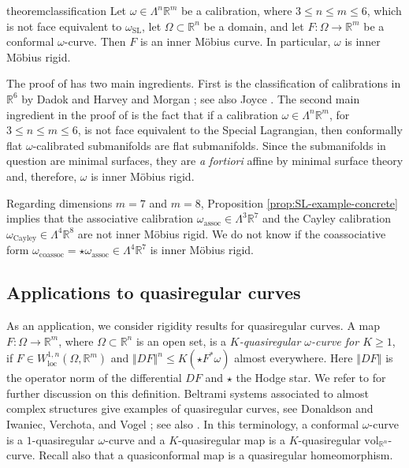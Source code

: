 \documentclass[a4paper,leqno,11pt]{amsart}
\numberwithin{equation}{section}
\theoremstyle{remark}
\theoremstyle{remark}
\newcommand{\R}{\mathbb{R}}
\DeclareMathOperator{\loc}{loc}
\newcommand{\norm}[1]{ \left\Vert #1 \right\Vert }	%
\newcommand{\vol}{\mathrm{vol}}
\newcommand{\SL}{\mathrm{SL}}
\newcommand{\assoc}{\mathrm{assoc}}
\newcommand{\coassoc}{\mathrm{coassoc}}
\newcommand{\Cayley}{\mathrm{Cayley}}
\begin{document}
\begin{restatable}{theorem}{classification}
\label{thm:classification-dim-six}
Let $\omega \in \Lambda^n \R^m$ be a calibration, where $3\le n \le m\le 6$, which is not face equivalent to $\omega_{\SL}$, let $\Omega \subset \R^n$ be a domain, and let $F \colon \Omega \to \R^m$ be a conformal $\omega$-curve. Then $F$ is an inner M\"obius curve. In particular, $\omega$ is inner M\"obius rigid.
\end{restatable}




The proof of  has two main ingredients. First is the classification of calibrations in $\R^6$ by Dadok and Harvey \cite{Dad:Har:83} and Morgan \cite{Mor:85}; see also Joyce \cite[Section 4.3]{Joy:07}. The second main ingredient in the proof of  is the fact that if a calibration $\omega \in \Lambda^n \R^m$, for $3 \leq n \leq m \leq 6$, is not face equivalent to the Special Lagrangian, then conformally flat $\omega$-calibrated submanifolds are flat submanifolds. Since the submanifolds in question are minimal surfaces, they are \emph{a fortiori} affine by minimal surface theory and, therefore, $\omega$ is inner M\"obius rigid.

Regarding dimensions $m=7$ and $m=8$, Proposition \ref{prop:SL-example-concrete} implies that the associative calibration $\omega_\assoc \in \Lambda^3 \R^7$ and the Cayley calibration $\omega_\Cayley\in \Lambda^4 \R^8$ are not inner M\"obius rigid. We do not know if the coassociative form $\omega_\coassoc = \star \omega_\assoc \in \Lambda^4 \R^7$ is inner M\"obius rigid. 











\subsection{Applications to quasiregular curves}

As an application, we consider rigidity results for quasiregular curves. A map $F\colon \Omega \to \R^m$, where $\Omega \subset \R^n$ is an open set, is a \emph{$K$-quasiregular $\omega$-curve for $K\ge 1$}, if $F\in W^{1,n}_{\loc}(\Omega, \R^m)$ and $\norm{DF}^n \le K (\star F^*\omega)$ almost everywhere. Here $\norm{DF}$ is the operator norm of the differential $DF$ and $\star$ the Hodge star. We refer to \cite{Pan:20} for further discussion on this definition. Beltrami systems associated to almost complex structures give examples of quasiregular curves, see Donaldson \cite{Don:96} and Iwaniec, Verchota, and Vogel \cite[Section 7]{Iwa:Ver:Vog:02}; see also \cite[Section 3]{Hei:Pan:Pry:23}. In this terminology, a conformal $\omega$-curve is a $1$-quasiregular $\omega$-curve and a $K$-quasiregular map is a $K$-quasiregular $\vol_{\R^n}$-curve. Recall also that a quasiconformal map is a quasiregular homeomorphism.
\end{document}
